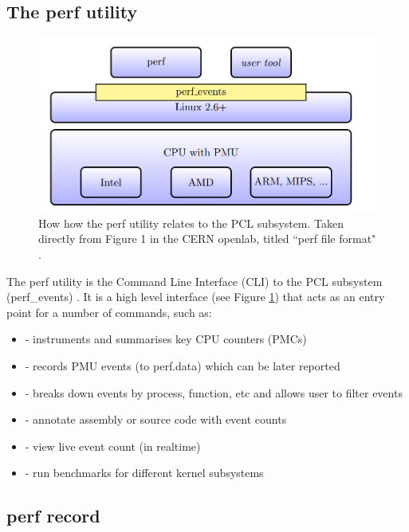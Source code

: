 \subsection{The perf utility}

\begin{figure}[h!]
\centering
    \includegraphics[width=0.8\linewidth]{report-a_perf_util_arch}
    \caption{How how the perf utility relates to the PCL subsystem. Taken directly from Figure 1 in the CERN openlab, titled ``perf file format" \cite{CERN_openlab_perf_file_format}.}
    \label{fig:perf_util_arch}
\end{figure}

The perf utility is the Command Line Interface (CLI) to the PCL subsystem (perf\_events) \cite{ManPerfCLI}. It is a high level interface (see Figure \ref{fig:perf_util_arch}) that acts as an entry point for a number of commands, such as:

\ssp
\begin{itemize}
    \item {} - instruments and summarises key CPU counters (PMCs)
    \item {} - records PMU events (to perf.data) which can be later reported
    \item {} - breaks down events by process, function, etc and allows user to filter events
    \item {} - annotate assembly or source code with event counts
    \item {} - view live event count (in realtime)
    \item {} - run benchmarks for different kernel subsystems
\end{itemize}
\dsp

\subsection{perf record}


